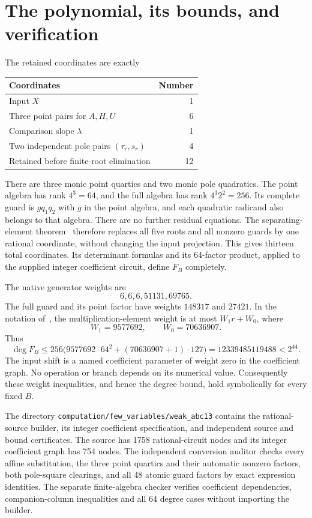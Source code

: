\documentclass[11pt,a4paper]{article}
\begin{document}
\section{The polynomial, its bounds, and verification}

The retained coordinates are exactly
\begin{center}
\begin{tabular}{lr}
\toprule
Coordinates & Number\\
\midrule
Input $X$ & 1\\
Three point pairs for $A,H,U$ & 6\\
Comparison slope $\lambda$ & 1\\
Two independent pole pairs $(\tau_r,s_r)$ & 4\\
\midrule
Retained before finite-root elimination & 12\\
\bottomrule
\end{tabular}
\end{center}
There are three monic point quartics and two monic pole quadratics.
The point algebra has rank $4^3=64$, and the full algebra has
rank $4^3 2^2=256$. Its complete guard is $gq_1q_2$ with
$g$ in the point algebra, and each quadratic radicand also belongs
to that algebra. There are no further residual equations.
The separating-element theorem~\cite{Active} therefore replaces
all five roots and all nonzero guards by one rational coordinate,
without changing the input projection. This gives thirteen total
coordinates. Its determinant formulas and its 64-factor product,
applied to the supplied integer coefficient circuit, define $F_B$
completely.

The native generator weights are
\[
                         6,6,6,51131,69765.
\]
The full guard and its point factor have weights $148317$ and
$27421$. In the notation of~\cite[Theorem~4.1]{Active},
the multiplication-element weight is at most $W_1r+W_0$, where
\[
                    W_1=9577692,\qquad W_0=70636907.
\]
Thus
\[
 \deg F_B\le256\bigl(9577692\cdot64^2
                         +(70636907+1)\cdot127\bigr)
             =12339485119488<2^{44}.
\]
The input shift is a named coefficient parameter of weight zero
in the coefficient graph. No operation or branch depends on its
numerical value. Consequently these weight inequalities, and hence
the degree bound, hold symbolically for every fixed $B$.

The directory \nolinkurl{computation/few_variables/weak_abc13}
contains the rational-source builder, its integer coefficient
specification, and independent source and bound certificates.
The source has 1758 rational-circuit nodes and its integer
coefficient graph has 754 nodes. The independent conversion auditor
checks every affine substitution, the three point quartics and
their automatic nonzero factors, both pole-square clearings,
and all 48 atomic guard factors by exact expression identities.
The separate finite-algebra checker verifies coefficient dependencies,
companion-column inequalities and all 64 degree cases without
importing the builder.
\end{document}
